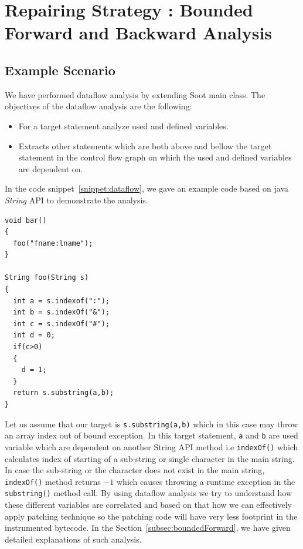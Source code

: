 

\section{Repairing Strategy : Bounded Forward and Backward Analysis}
\label{sec:boundedAnalysis}

\subsection{Example Scenario}
\label{subsec:exampleScenario}

We have performed dataflow analysis by extending Soot main class. The objectives
of the dataflow analysis are the following:

\begin{itemize}
  \item For a target statement analyze used and defined variables.
  
  \item Extracts other statements which are both above and bellow the target
  statement in the control flow graph on which the used and defined variables
  are dependent on.
  
\end{itemize}

In the code snippet~\ref{snippet:dataflow}, we gave an example code based on java
\emph{String} API to demonstrate the analysis.


\lstset{language=Java, caption=Dataflow analysis,
label=snippet:dataflow}
\begin{lstlisting}
void bar()
{
  foo("fname:lname");
}

String foo(String s)
{
  int a = s.indexof(":");
  int b = s.indexOf("&");
  int c = s.indexOf("#");
  int d = 0;
  if(c>0)
  {
    d = 1;
  }
  return s.substring(a,b);
}

\end{lstlisting}

Let us assume that our target is \texttt{s.substring(a,b)} which in this case
may throw an array index out of bound exception. In this target statement,
\texttt{a} and \texttt{b} are used variable which are dependent on another
String API method i.e \texttt{indexOf()} which calculates index of starting of a
sub-string or single character in the main string. In case the sub-string or the
character does not exist in the main string, \texttt{indexOf()} method returns
$-1$ which causes throwing a runtime exception in the \texttt{substring()}
method call.
\newline
By using dataflow analysis we try to understand how these different variables
are correlated and based on that how we can effectively apply patching technique
so the patching code will have very less footprint in the instrumented bytecode.
In the Section~\ref{subsec:boundedForward}, we have given detailed explanations
of such analysis.


